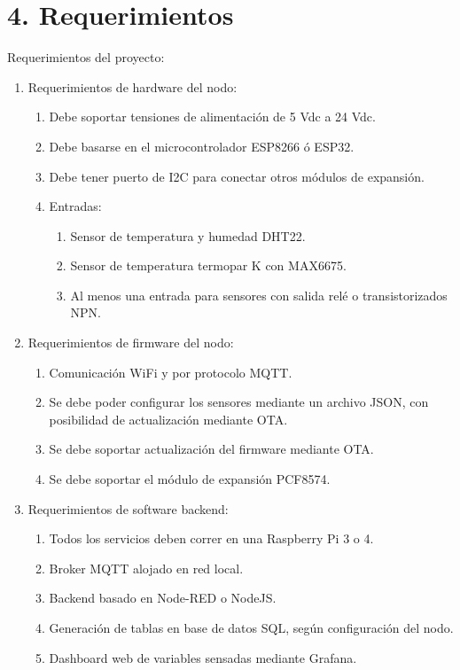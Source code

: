 \documentclass[11pt]{charter}
\begin{document}
\section{4. Requerimientos}
\label{sec:requerimientos}

Requerimientos del proyecto:


\begin{enumerate}
\item Requerimientos de hardware del nodo:
	\begin{enumerate}
	\item Debe soportar tensiones de alimentación de 5 Vdc a 24 Vdc.
	\item Debe basarse en el microcontrolador ESP8266 ó ESP32.
	\item Debe tener puerto de I2C para conectar otros módulos de expansión.
	\item Entradas:
		\begin{enumerate}
		\item Sensor de temperatura y humedad DHT22.
		\item Sensor de temperatura termopar K con MAX6675.
		\item Al menos una entrada para sensores con salida relé o transistorizados NPN.
		\end{enumerate}
	\end{enumerate}
\item Requerimientos de firmware del nodo:
	\begin{enumerate}
	\item Comunicación WiFi y por protocolo MQTT.
	\item Se debe poder configurar los sensores mediante un archivo JSON, con posibilidad de actualización mediante OTA.
	\item Se debe soportar actualización del firmware mediante OTA.
	\item Se debe soportar el módulo de expansión PCF8574.
	\end{enumerate}
\item Requerimientos de software backend:
	\begin{enumerate}
	\item Todos los servicios deben correr en una Raspberry Pi 3 o 4.
	\item Broker MQTT alojado en red local.
	\item Backend basado en Node-RED o NodeJS.
	\item Generación de tablas en base de datos SQL, según configuración del nodo.
	\item Dashboard web de variables sensadas mediante Grafana.
	\end{enumerate}
\end{enumerate}
\end{document}

